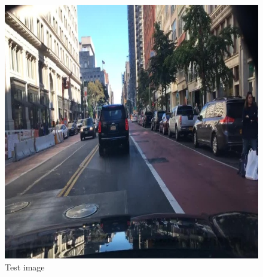 \begin{figure}
\centering
\includegraphics[width=\subfigwidth]{images/gpt4/d1.jpg}
\caption{Test image}
\label{fig:test_image}
\end{figure}

